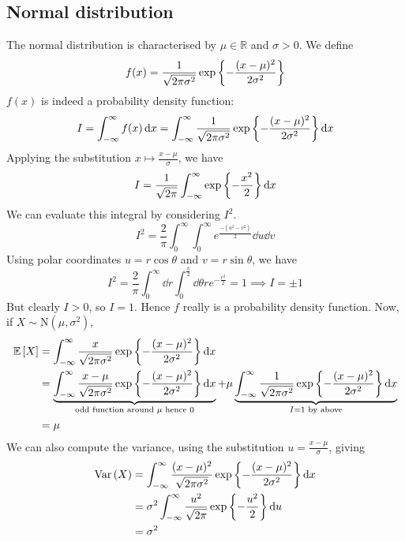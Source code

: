 \subsection{Normal distribution}
The normal distribution is characterised by \(\mu \in \mathbb R\) and \(\sigma > 0\).
We define
\[
	f(x) = \frac{1}{\sqrt{2 \pi \sigma^2}} \exp\qty{-\frac{(x-\mu)^2}{2\sigma^2}}
\]
\(f(x)\) is indeed a probability density function:
\[
	I = \int_{-\infty}^\infty f(x) \dd{x} = \int_{-\infty}^\infty \frac{1}{\sqrt{2 \pi \sigma^2}} \exp\qty{-\frac{(x-\mu)^2}{2\sigma^2}} \dd{x}
\]
Applying the substitution \(x \mapsto \frac{x-\mu}{\sigma}\), we have
\[
	I = \frac{1}{\sqrt{2 \pi}} \int_{-\infty}^\infty \exp\qty{-\frac{x^2}{2}} \dd{x}
\]
We can evaluate this integral by considering \(I^2\).
\[
	I^2 = \frac{2}{\pi} \int_0^\infty \int_0^\infty e^{\frac{-(u^2 - v^2)}{2}} \dd{u}\dd{v}
\]
Using polar coordinates \(u = r\cos\theta\) and \(v = r\sin\theta\), we have
\[
	I^2 = \frac{2}{\pi} \int_0^\infty \dd{r} \int_0^{\frac{\pi}{2}} \dd{\theta} re^{-\frac{r^2}{2}} = 1 \implies I = \pm 1
\]
But clearly \(I > 0\), so \(I=1\).
Hence \(f\) really is a probability density function.
Now, if \(X \sim \mathrm{N}(\mu, \sigma^2)\),
\begin{align*}
	\mathbb{E}\left[{X}\right] & = \int_{-\infty}^{\infty} \frac{x}{\sqrt{2\pi\sigma^2}} \exp\qty{-\frac{(x-\mu)^2}{2\sigma^2}} \dd{x}                                                                                                                                                                                                                      \\
	           & = \underbrace{\int_{-\infty}^{\infty} \frac{x - \mu}{\sqrt{2\pi\sigma^2}} \exp\qty{-\frac{(x-\mu)^2}{2\sigma^2}} \dd{x}}_{\text{odd function around } \mu \text{ hence } 0} + \mu\underbrace{\int_{-\infty}^{\infty} \frac{1}{\sqrt{2\pi\sigma^2}} \exp\qty{-\frac{(x-\mu)^2}{2\sigma^2}} \dd{x}}_{I = 1 \text{ by above}} \\
	           & = \mu                                                                                                                                                                                                                                                                                                                      \\
\end{align*}
We can also compute the variance, using the substitution \(u = \frac{x - \mu}{\sigma}\), giving
\begin{align*}
	\operatorname{Var}\left({X}\right) & = \int_{-\infty}^{\infty} \frac{(x - \mu)^2}{\sqrt{2\pi\sigma^2}} \exp\qty{-\frac{(x-\mu)^2}{2\sigma^2}} \dd{x} \\
	        & = \sigma^2 \int_{-\infty}^{\infty} \frac{u^2}{\sqrt{2\pi}} \exp\qty{-\frac{u^2}{2}} \dd{u}                      \\
	        & = \sigma^2
\end{align*}
